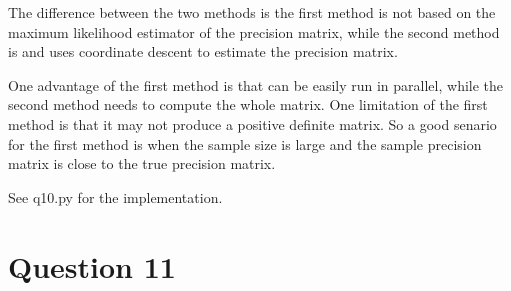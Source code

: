 \documentclass{article}
\begin{document}
The difference between the two methods is the first method is not based on the maximum likelihood estimator of the precision matrix, while the second method is and uses coordinate descent to estimate the precision matrix.

One advantage of the first method is that can be easily run in parallel, while the second method needs to compute the whole matrix. One limitation of the first method is that it may not produce a positive definite matrix. So a good senario for the first method is when the sample size is large and the sample precision matrix is close to the true precision matrix.

See q10.py for the implementation.

\section*{Question 11}
\end{document}

